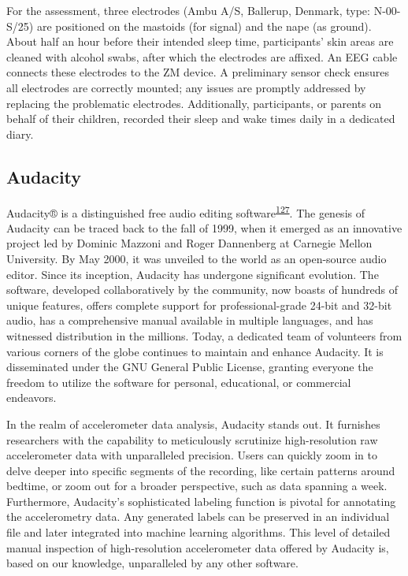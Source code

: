 \documentclass[
  10pt,
]{scrbook}
\begin{document}
For the assessment, three electrodes (Ambu A/S, Ballerup, Denmark, type:
N-00-S/25) are positioned on the mastoids (for signal) and the nape (as
ground). About half an hour before their intended sleep time,
participants' skin areas are cleaned with alcohol swabs, after which the
electrodes are affixed. An EEG cable connects these electrodes to the ZM
device. A preliminary sensor check ensures all electrodes are correctly
mounted; any issues are promptly addressed by replacing the problematic
electrodes. Additionally, participants, or parents on behalf of their
children, recorded their sleep and wake times daily in a dedicated
diary.

\hypertarget{audacity}{%
\subsection{Audacity}\label{audacity}}

Audacity®️ is a distinguished free audio editing
software\textsuperscript{\protect\hyperlink{ref-audacity}{127}}. The
genesis of Audacity can be traced back to the fall of 1999, when it
emerged as an innovative project led by Dominic Mazzoni and Roger
Dannenberg at Carnegie Mellon University. By May 2000, it was unveiled
to the world as an open-source audio editor. Since its inception,
Audacity has undergone significant evolution. The software, developed
collaboratively by the community, now boasts of hundreds of unique
features, offers complete support for professional-grade 24-bit and
32-bit audio, has a comprehensive manual available in multiple
languages, and has witnessed distribution in the millions. Today, a
dedicated team of volunteers from various corners of the globe continues
to maintain and enhance Audacity. It is disseminated under the GNU
General Public License, granting everyone the freedom to utilize the
software for personal, educational, or commercial endeavors.

In the realm of accelerometer data analysis, Audacity stands out. It
furnishes researchers with the capability to meticulously scrutinize
high-resolution raw accelerometer data with unparalleled precision.
Users can quickly zoom in to delve deeper into specific segments of the
recording, like certain patterns around bedtime, or zoom out for a
broader perspective, such as data spanning a week. Furthermore,
Audacity's sophisticated labeling function is pivotal for annotating the
accelerometry data. Any generated labels can be preserved in an
individual file and later integrated into machine learning algorithms.
This level of detailed manual inspection of high-resolution
accelerometer data offered by Audacity is, based on our knowledge,
unparalleled by any other software.
\end{document}

